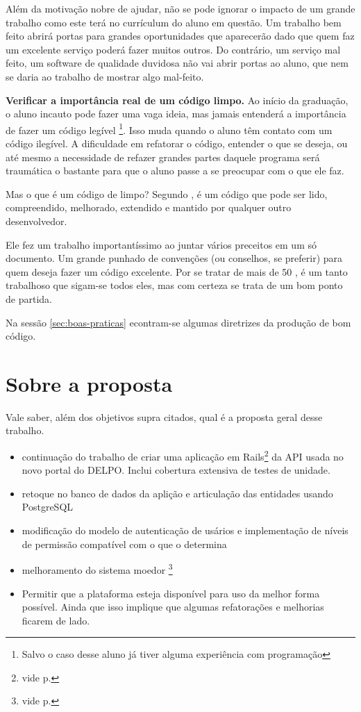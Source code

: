 Além da motivação nobre de ajudar, não se pode ignorar o impacto de um grande trabalho como
este terá no currículum do aluno em questão. Um trabalho bem feito abrirá portas para grandes
oportunidades que aparecerão dado que quem faz um excelente serviço poderá fazer muitos outros.
Do contrário, um serviço mal feito, um software de qualidade duvidosa não vai abrir portas ao
aluno, que nem se daria ao trabalho de mostrar algo mal-feito.

\textbf{Verificar a importância real de um código limpo.} Ao início da graduação, o aluno incauto
pode fazer uma vaga ideia, mas jamais entenderá a importância de fazer um código legível
\footnote{Salvo o caso desse aluno já tiver alguma experiência com programação}. Isso muda quando
o aluno têm contato com um código ilegível. A dificuldade em refatorar o código, entender o que se
deseja, ou até mesmo a necessidade de refazer grandes partes daquele programa será traumática o
bastante para que o aluno passe a se preocupar com o que ele faz.

Mas o que é um código de limpo? Segundo \citeauthor{CCL}, é um código que pode ser lido, compreendido,
melhorado, extendido e mantido por qualquer outro desenvolvedor.

Ele fez um trabalho importantíssimo ao juntar vários preceitos em um só documento. Um grande punhado
de convenções (ou conselhos, se preferir) para quem deseja fazer um código excelente. Por se tratar de
mais de 50 , é um tanto trabalhoso que sigam-se todos eles, mas com certeza se trata de um bom
ponto de partida.

Na sessão \ref{sec:boas-praticas} econtram-se algumas diretrizes da produção de bom código.

\section{Sobre a proposta} \label{sec:proposta}

Vale saber, além dos objetivos supra citados, qual é a proposta geral desse trabalho.
\begin{itemize}
    \item continuação do trabalho de criar uma aplicação em Rails\footnote{vide p.\pageref{subsec:rails}}
    da API usada no novo portal do DELPO. Inclui cobertura extensiva de testes de unidade.
    \item retoque no banco de dados da aplição e articulação das entidades usando PostgreSQL
    \item modificação do modelo de autenticação de usários e implementação de níveis de permissão compatível
    com o que o  determina
    \item melhoramento do sistema moedor \footnote{vide p.\pageref{subsec:moagem}}
    \item Permitir que a plataforma esteja disponível para uso da melhor forma possível. Ainda que isso
    implique que algumas refatorações e melhorias ficarem de lado.
\end{itemize}

